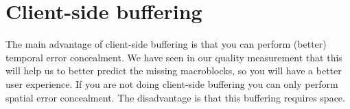 \documentclass[a4paper,11pt,oneside]{article}
\begin{document}
\section*{Client-side buffering}
\vspace{-0.5cm}
The main advantage of client-side buffering is that you can perform (better) temporal error concealment. We have seen in our quality measurement that this will help us to better predict the missing macroblocks, so you will have a better user experience. If you are not doing client-side buffering you can only perform spatial error concealment. The disadvantage is that this buffering requires space.
\end{document}
